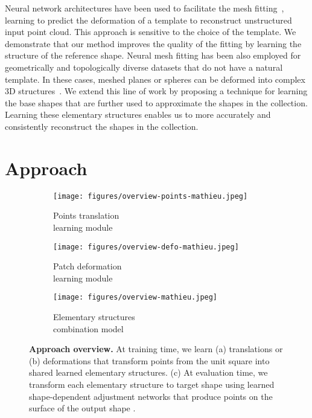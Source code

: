\documentclass{article}
\begin{document}
Neural network architectures have been used to facilitate the mesh fitting~\cite{groueix2018b}, learning to predict the deformation of a template to reconstruct unstructured input point cloud. This approach is sensitive to the choice of the template. We demonstrate that our method improves the quality of the fitting by learning the structure of the reference shape. Neural mesh fitting has been also employed for geometrically and topologically diverse datasets that do not have a natural template. In these cases, meshed planes or spheres can be deformed into complex 3D structures~\cite{groueix2018,Yang_2018}.   We extend this line of work by proposing a technique for learning the base shapes that are further used to approximate the shapes in the collection. Learning these elementary structures enables us to more accurately and consistently reconstruct the shapes in the collection.


\section{Approach}
\label{sec:approach}

\begin{figure}[t!]
\captionsetup{justification=centering}
\centering
\begin{center}
\begin{subfigure}[t]{.32\textwidth}
  \centering
  \hspace*{-2em}
  \texttt{[image: figures/overview-points-mathieu.jpeg]}
  \caption{Points translation \\ learning module}
  \label{fig:overview-point}
\end{subfigure}
\begin{subfigure}[t]{.32\textwidth}
  \centering
  \hspace*{-2em}
  \texttt{[image: figures/overview-defo-mathieu.jpeg]}
  \caption{Patch deformation \\learning module}
  \label{fig:overview-defo}
\end{subfigure}
\begin{subfigure}[t]{.32\textwidth}
  \centering
   \hspace*{-2em}
  \texttt{[image: figures/overview-mathieu.jpeg]}
  \caption{Elementary structures \\ combination model}
  \label{fig:overview-network}
\end{subfigure}
\end{center}
\caption{\textbf{Approach overview.} At training time, we learn (a) translations  or (b) deformations  that transform points from the unit square  into shared learned elementary structures. (c) At evaluation time, we transform each elementary structure  to target shape  using learned shape-dependent adjustment networks  that produce points on the surface of the output shape .}

\label{fig:overview}
\vspace{-1em}
\end{figure}
\end{document}
